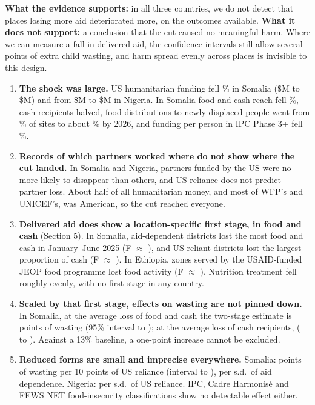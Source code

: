 \documentclass[11pt]{article}
\newcommand{\hd}[1]{\par\medskip{\sffamily\large\bfseries\color{navy}#1}\par}
\begin{document}
\hd{Bottom line}
\textbf{What the evidence supports:} in all three countries, we do not detect that places losing more aid deteriorated more, on the outcomes available. \textbf{What it does not support:} a conclusion that the cut caused no meaningful harm. Where we can measure a fall in delivered aid, the confidence intervals still allow several points of extra child wasting, and harm spread evenly across places is invisible to this design.
\begin{enumerate}
  \item \textbf{The shock was large.} US humanitarian funding fell \nUsDrop\% in Somalia (\$\nUsTwentyFour{}M to \$\nUsTwentyFive{}M) and from \$\nngUsTf{}M to \$\nngUsTv{}M in Nigeria. In Somalia food and cash reach fell \ndvFscDrop\%, cash recipients halved, food distributions to newly displaced people went from \ndpFoodPre\% of sites to about \ndpFoodTsix\% by 2026, and funding per person in IPC Phase 3+ fell \nPerPDrop\%.
  \item \textbf{Records of which partners worked where do not show where the cut landed.} In Somalia and Nigeria, partners funded by the US were no more likely to disappear than others, and US reliance does not predict partner loss. About half of all humanitarian money, and most of WFP's and UNICEF's, was American, so the cut reached everyone.
  \item \textbf{Delivered aid does show a location-specific first stage, in food and cash} (Section 5). In Somalia, aid-dependent districts lost the most food and cash in January--June 2025 (F $\approx$ \ndvFFscLIdxGu), and US-reliant districts lost the largest proportion of cash (F $\approx$ \nfsFLogUs). In Ethiopia, zones served by the USAID-funded JEOP food programme lost food activity (F $\approx$ \netFFoodJeop). Nutrition treatment fell roughly evenly, with no first stage in any country.
  \item \textbf{Scaled by that first stage, effects on wasting are not pinned down.} In Somalia, at the average loss of food and cash the two-stage estimate is \ndvIvAtFscLIdxGamGu{} points of wasting (95\% interval \ndvIvAtLoFscLIdxGamGu{} to \ndvIvAtHiFscLIdxGamGu); at the average loss of cash recipients, \nivAtMeanReachIdxGam{} (\nivAtMeanLoReachIdxGam{} to \nivAtMeanHiReachIdxGam). Against a 13\% baseline, a one-point increase cannot be excluded.
  \item \textbf{Reduced forms are small and imprecise everywhere.} Somalia: \nbPredGam{} points of wasting per 10 points of US reliance (interval \nloPredGam{} to \nhiPredGam), \nbIdxGam{} per s.d.\ of aid dependence. Nigeria: \nngBUsGam{} per s.d.\ of US reliance. IPC, Cadre Harmonis\'e and FEWS NET food-insecurity classifications show no detectable effect either.

\end{enumerate}
\end{document}
